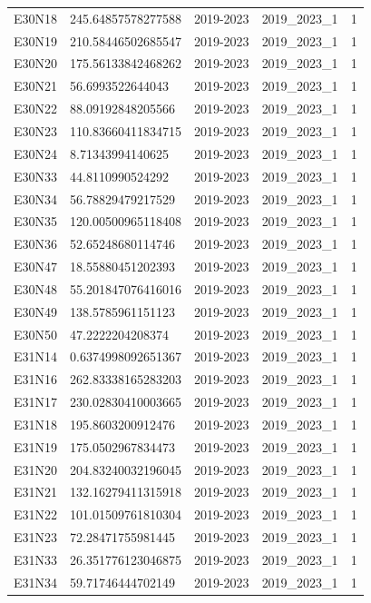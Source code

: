\begin{landscape}
\begin{longtable}{lllll}
E30N18 & 245.64857578277588 & 2019-2023 & 2019\_2023\_1 & 1 \\
E30N19 & 210.58446502685547 & 2019-2023 & 2019\_2023\_1 & 1 \\
E30N20 & 175.56133842468262 & 2019-2023 & 2019\_2023\_1 & 1 \\
E30N21 & 56.6993522644043 & 2019-2023 & 2019\_2023\_1 & 1 \\
E30N22 & 88.09192848205566 & 2019-2023 & 2019\_2023\_1 & 1 \\
E30N23 & 110.83660411834715 & 2019-2023 & 2019\_2023\_1 & 1 \\
E30N24 & 8.71343994140625 & 2019-2023 & 2019\_2023\_1 & 1 \\
E30N33 & 44.8110990524292 & 2019-2023 & 2019\_2023\_1 & 1 \\
E30N34 & 56.78829479217529 & 2019-2023 & 2019\_2023\_1 & 1 \\
E30N35 & 120.00500965118408 & 2019-2023 & 2019\_2023\_1 & 1 \\
E30N36 & 52.65248680114746 & 2019-2023 & 2019\_2023\_1 & 1 \\
E30N47 & 18.55880451202393 & 2019-2023 & 2019\_2023\_1 & 1 \\
E30N48 & 55.201847076416016 & 2019-2023 & 2019\_2023\_1 & 1 \\
E30N49 & 138.5785961151123 & 2019-2023 & 2019\_2023\_1 & 1 \\
E30N50 & 47.2222204208374 & 2019-2023 & 2019\_2023\_1 & 1 \\
E31N14 & 0.6374998092651367 & 2019-2023 & 2019\_2023\_1 & 1 \\
E31N16 & 262.83338165283203 & 2019-2023 & 2019\_2023\_1 & 1 \\
E31N17 & 230.02830410003665 & 2019-2023 & 2019\_2023\_1 & 1 \\
E31N18 & 195.8603200912476 & 2019-2023 & 2019\_2023\_1 & 1 \\
E31N19 & 175.0502967834473 & 2019-2023 & 2019\_2023\_1 & 1 \\
E31N20 & 204.83240032196045 & 2019-2023 & 2019\_2023\_1 & 1 \\
E31N21 & 132.16279411315918 & 2019-2023 & 2019\_2023\_1 & 1 \\
E31N22 & 101.01509761810304 & 2019-2023 & 2019\_2023\_1 & 1 \\
E31N23 & 72.28471755981445 & 2019-2023 & 2019\_2023\_1 & 1 \\
E31N33 & 26.351776123046875 & 2019-2023 & 2019\_2023\_1 & 1 \\
E31N34 & 59.71746444702149 & 2019-2023 & 2019\_2023\_1 & 1 \\

\end{longtable}
\end{landscape}
